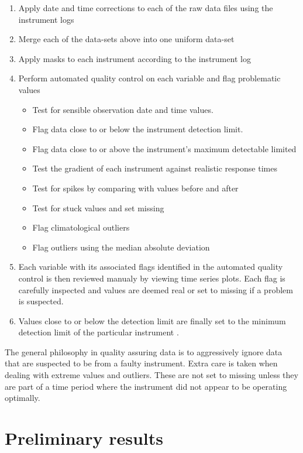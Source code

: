 \documentclass{nwureport}
\begin{document}
\begin{enumerate}
\item Apply date and time corrections to each of the raw data files
  using the instrument logs
\item Merge each of the data-sets above into one uniform data-set
\item Apply masks to each instrument according to the instrument log
\item Perform automated quality control on each variable and flag problematic values
  \begin{itemize}
   \item Test for sensible observation date and time values.
   \item Flag data close to or below the instrument detection limit. 
   \item Flag data close to or above the instrument's maximum detectable limited
   \item Test the gradient of each instrument against realistic response times
   \item Test for spikes by comparing with values before and after
   \item Test for stuck values and set missing
   \item Flag climatological outliers
   \item Flag outliers using the median absolute deviation
  \end{itemize}
\item Each variable with its associated flags identified in the automated quality control is then reviewed manualy by viewing time series plots. Each flag is carefully inspected and values are deemed real or set to missing if a problem is suspected.
\item Values close to or below the detection limit are finally set to the minimum detection limit of the particular instrument \citep{Croghan2003}.
\end{enumerate}

The general philosophy in quality assuring data is to aggressively
ignore data that are suspected to be from a faulty instrument. Extra
care is taken when dealing with extreme values and outliers. These are
not set to missing unless they are part of a time period where the
instrument did not appear to be operating optimally.

\section{Preliminary results}
\end{document}
